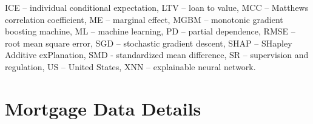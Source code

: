 \documentclass[information,article,submit,moreauthors,pdftex]{definitions/mdpi}
\begin{document}
{ICE -- individual conditional expectation, %
LTV -- loan to value, %
MCC -- Matthews correlation coefficient, %
ME -- marginal effect, %
MGBM -- monotonic gradient boosting machine, %
ML -- machine learning, %
PD -- partial dependence, %
RMSE -- root mean square error, %
SGD -- stochastic gradient descent, %
SHAP -- SHapley Additive exPlanation, %
SMD - standardized mean difference, %
SR -- supervision and regulation, %
US -- United States, %
XNN -- explainable neural network.} %

\vspace{6pt} 

\appendix

\section{Mortgage Data Details}\label{a_sec:mort}
\end{document}
